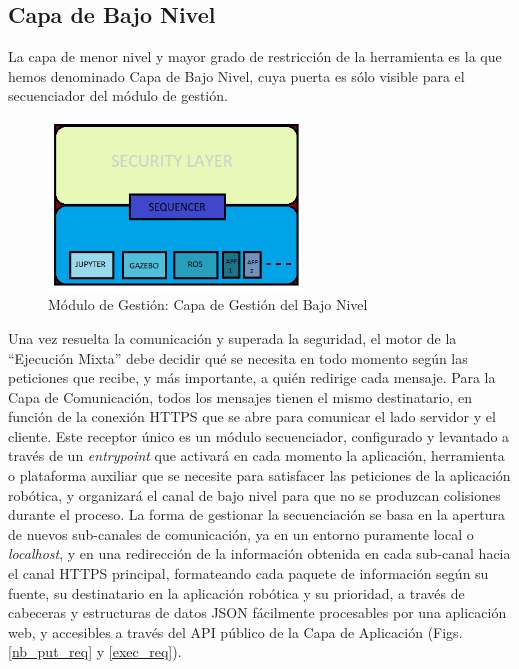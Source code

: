 \subsection{Capa de Bajo Nivel}

La capa de menor nivel y mayor grado de restricción de la herramienta es la que hemos denominado Capa de Bajo Nivel, cuya puerta es sólo visible para el secuenciador del módulo de gestión.
\begin{figure}[!hbtp]  \centering\noindent
    \includegraphics[width=0.6\textwidth]{figures/layer1.png}
    \caption{Módulo de Gestión: Capa de Gestión del Bajo Nivel}
    \label{layer1}
\end{figure}

Una vez resuelta la comunicación y superada la seguridad, el motor de la ``Ejecución Mixta'' debe decidir qué se necesita en todo momento según las peticiones que recibe, y más importante, a quién redirige cada mensaje. Para la Capa de Comunicación, todos los mensajes tienen el mismo destinatario, en función de la conexión HTTPS que se abre para comunicar el lado servidor y el cliente. Este receptor único es un módulo secuenciador, configurado y levantado a través de un \textit{entrypoint} que activará en cada momento la aplicación, herramienta o plataforma auxiliar que se necesite para satisfacer las peticiones de la aplicación robótica, y organizará el canal de bajo nivel para que no se produzcan colisiones durante el proceso. La forma de gestionar la secuenciación se basa en la apertura de nuevos sub-canales de comunicación, ya en un entorno puramente local o \textit{localhost}, y en una redirección de la información obtenida en cada sub-canal hacia el canal HTTPS principal, formateando cada paquete de información según su fuente, su destinatario en la aplicación robótica y su prioridad, a través de cabeceras y estructuras de datos JSON fácilmente procesables por una aplicación web, y accesibles a través del API público de la Capa de Aplicación (Figs. \ref{nb_put_req} y \ref{exec_req}).

